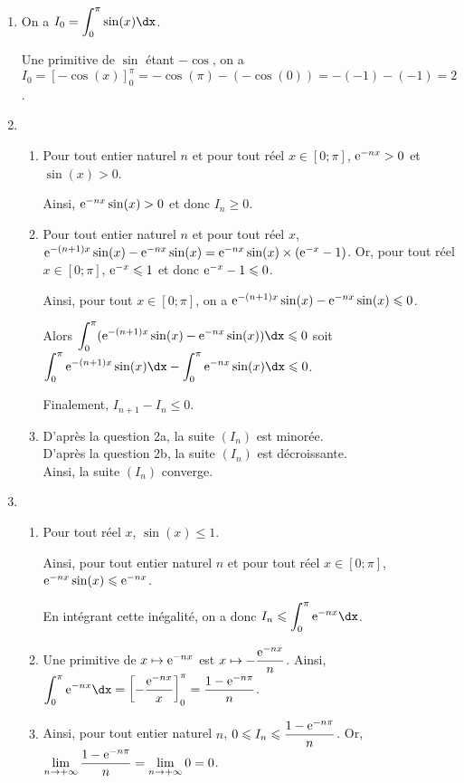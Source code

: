\documentclass[11pt,fleqn, openany]{book} %
\begin{document}
\begin{solution}\hspace{0pt}


\begin{enumerate}
\item On a $I_0=\displaystyle\int_0^{\pi}\sin(x)\dx$. 

Une primitive de $\sin$ étant $-\cos$, on a $I_0=[-\cos(x)]_0^{\pi}=-\cos(\pi)-(-\cos(0))=-(-1)-(-1)=2$.
\item \begin{enumerate}
\vskip5pt
\item Pour tout entier naturel $n$ et pour tout réel $x \in [0; \pi]$, $\mathrm{e}^{-nx}>0$ et $\sin(x)>0$. 

Ainsi, $\mathrm{e}^{-nx}\sin(x)>0$ et donc $I_n \geqslant 0$.
\vskip5pt
\item Pour tout entier naturel $n$ et pour tout réel $x$, $\mathrm{e}^{-(n+1)x}\sin(x)-\mathrm{e}^{-nx}\sin(x)=\mathrm{e}^{-nx}\sin(x) \times(\mathrm{e}^{-x}-1)$. Or, pour tout réel $x\in[0;\pi]$, $\mathrm{e}^{-x} \leqslant 1$ et donc $\mathrm{e}^{-x}-1 \leqslant 0$.

Ainsi, pour tout $x \in [0;\pi]$, on a $\mathrm{e}^{-(n+1)x}\sin(x)-\mathrm{e}^{-nx}\sin(x)\leqslant 0$. 

Alors $\displaystyle\int_0^{\pi}(\e^{-(n+1)x}\sin(x)-\e^{-nx}\sin(x))\dx\leqslant 0$ soit $\displaystyle\int_0^{\pi}\e^{-(n+1)x}\sin(x)\dx-\int_0^{\pi}\e^{-nx}\sin(x)\dx\leqslant 0$. 

Finalement, $I_{n+1}-I_n \leqslant 0$.
\vskip5pt
\item D'après la question 2a, la suite $(I_n)$ est minorée. \\D'après la question 2b, la suite $(I_n)$ est décroissante.\\ Ainsi, la suite $(I_n)$ converge.\end{enumerate}

\item \begin{enumerate}
\item Pour tout réel $x$, $\sin(x)\leqslant 1$. 

Ainsi, pour tout entier naturel $n$ et pour tout réel $x\in[0;\pi]$, $\mathrm{e}^{-nx}\sin(x) \leqslant \mathrm{e}^{-nx}$. 

En intégrant cette inégalité, on a donc $I_n \leqslant \displaystyle\int_0^{\pi} \e^{-nx}\dx$.
\vskip5pt
\item Une primitive de $x\mapsto \mathrm{e}^{-nx}$ est $x\mapsto -\dfrac{\mathrm{e}^{-nx}}{n}$. Ainsi, $\displaystyle\int_0^{\pi} \e^{-nx}\dx=\left[ -\dfrac{\e^{-nx}}{x}\right]_0^{\pi}=\dfrac{1-\e^{-n\pi}}{n}$.
\vskip5pt
\item Ainsi, pour tout entier naturel $n$, $0 \leqslant I_n \leqslant \dfrac{1-\mathrm{e}^{-n\pi}}{n}$. Or, $\displaystyle\lim_{n \to +\infty} \dfrac{1-\mathrm{e}^{-n\pi}}{n} = \displaystyle\lim_{n \to + \infty}0=0$. 


\end{enumerate}
\end{enumerate}
\end{solution}
\end{document}
